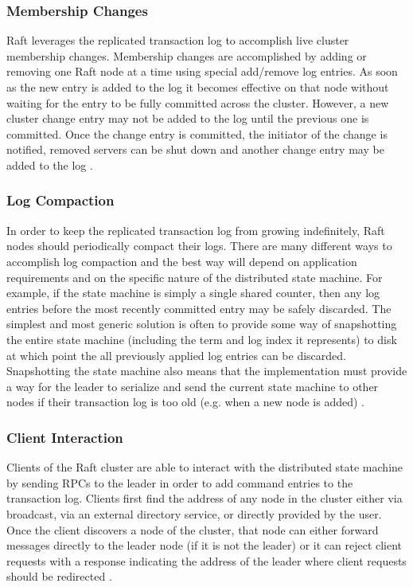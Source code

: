 \documentclass[9pt]{extarticle}
\begin{document}
\begin{multicols}{2}
\subsubsection{Membership Changes}

Raft leverages the replicated transaction log to accomplish live
cluster membership changes. Membership changes are accomplished by
adding or removing one Raft node at a time using special add/remove
log entries. As soon as the new entry is added to the log it becomes
effective on that node without waiting for the entry to be fully
committed across the cluster. However, a new cluster change entry may
not be added to the log until the previous one is committed. Once the
change entry is committed, the initiator of the change is notified,
removed servers can be shut down and another change entry may be added
to the log \cite[Section~4]{raft_thesis:ongaro14}.

\subsubsection{Log Compaction}

In order to keep the replicated transaction log from growing
indefinitely, Raft nodes should periodically compact their logs. There
are many different ways to accomplish log compaction and the best way
will depend on application requirements and on the specific nature of
the distributed state machine. For example, if the state machine is
simply a single shared counter, then any log entries before the most
recently committed entry may be safely discarded. The simplest and
most generic solution is often to provide some way of snapshotting the
entire state machine (including the term and log index it represents)
to disk at which point the all previously applied log entries can be
discarded. Snapshotting the state machine also means that the
implementation must provide a way for the leader to serialize and send
the current state machine to other nodes if their transaction log is
too old (e.g. when a new node is added)
\cite[Section~5]{raft_thesis:ongaro14}.

\subsubsection{Client Interaction}

Clients of the Raft cluster are able to interact with the distributed
state machine by sending RPCs to the leader in order to add command
entries to the transaction log. Clients first find the address of any
node in the cluster either via broadcast, via an external directory
service, or directly provided by the user. Once the client discovers
a node of the cluster, that node can either forward messages directly
to the leader node (if it is not the leader) or it can reject client
requests with a response indicating the address of the leader where
client requests should be redirected
\cite[Section~6.2]{raft_thesis:ongaro14}.


\end{multicols}
\end{document}
